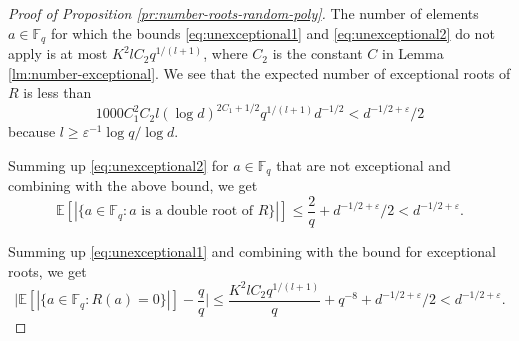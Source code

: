 \documentclass[10pt,a4paper]{amsart}
\def\E{\mathbb E}
\def\F{\mathbb F}
\newcommand{\e}{\varepsilon}
\begin{document}
\begin{proof}[Proof of Proposition \ref{pr:number-roots-random-poly}]
The number of elements $a\in\F_q$ for which the bounds \eqref{eq:unexceptional1}
and \eqref{eq:unexceptional2} do not apply is at most
$K^2lC_2q^{1/(l+1)}$, where $C_2$ is the constant
$C$ in Lemma \ref{lm:number-exceptional}.
We see that the expected number of exceptional roots of $R$ is less than
\[
1000C_1^2C_2l(\log d)^{2C_1+1/2}q^{1/(l+1)} d^{-1/2}<d^{-1/2+\e}/2
\]
because $l\ge \e^{-1}\log q/\log d$.

Summing up \eqref{eq:unexceptional2} for $a\in\F_q$ that are not exceptional
and combining with the above bound, we get
\[
\E[|\{a\in\F_q: \text{$a$ is a double root of $R$}\}|]\le \frac{2}{q}+d^{-1/2+\e}/2
< d^{-1/2+\e}.
\]

Summing up \eqref{eq:unexceptional1} and combining with the bound for exceptional
roots, we get
\[
\Big|\E[|\{a\in\F_q: R(a)=0\}|]-\frac{q}{q}\Big|
\le \frac{K^2lC_2q^{1/(l+1)}}{q}+q^{-8}+ d^{-1/2+\e}/2<d^{-1/2+\e}.
\]
\end{proof}
\end{document}
